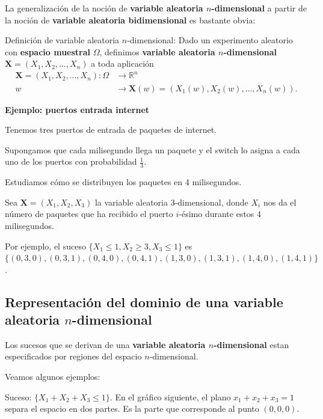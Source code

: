 \documentclass[]{book}
\begin{document}
La generalización de la noción de \textbf{variable aleatoria \(n\)-dimensional} a partir de la noción de \textbf{variable aleatoria bidimensional} es bastante obvia:

Definición de variable aleatoria \(n\)-dimensional:
Dado un experimento aleatorio con \textbf{espacio muestral} \(\Omega\), definimos \textbf{variable aleatoria \(n\)-dimensional} \(\mathbf{X}=(X_1,X_2,\ldots,X_n)\) a toda aplicación
\[
\begin{array}{rl}
\mathbf{X}=(X_1,X_2,\ldots,X_n): \Omega & \longrightarrow \mathbb{R}^n\\
w & \longrightarrow \mathbf{X}(w)=(X_1(w),X_2(w),\ldots,X_n(w)).
\end{array}
\]

\textbf{Ejemplo: puertos entrada internet}

Tenemos tres puertos de entrada de paquetes de internet.

Supongamos que cada milisegundo llega un paquete y el switch lo asigna a cada uno de los puertos con probabilidad \(\frac{1}{3}\).

Estudiamos cómo se distribuyen los paquetes en 4 milisegundos.

Sea \(\mathbf{X}=(X_1,X_2,X_3)\) la variable aleatoria 3-dimensional, donde \(X_i\) nos da el número de paquetes que ha recibido el puerto \(i\)-ésimo durante estos 4 milisegundos.

Por ejemplo, el suceso \(\{X_1\leq 1, X_2\geq 3, X_3\leq 1\}\) es \(\{(0,3,0),(0,3,1),(0,4,0),(0,4,1),(1,3,0),(1,3,1),(1,4,0),(1,4,1)\}\).

\hypertarget{representaciuxf3n-del-dominio-de-una-variable-aleatoria-n-dimensional}{%
\subsection{\texorpdfstring{Representación del dominio de una variable aleatoria \(n\)-dimensional}{Representación del dominio de una variable aleatoria n-dimensional}}\label{representaciuxf3n-del-dominio-de-una-variable-aleatoria-n-dimensional}}

Los sucesos que se derivan de una \textbf{variable aleatoria \(n\)-dimensional} estan especificados por regiones del espacio \(n\)-dimensional.

Veamos algunos ejemplos:

Suceso: \(\{X_1+X_2+X_3\leq 1\}\). En el gráfico siguiente, el plano \(x_1+x_2+x_3=1\) separa el espacio en dos partes. Es la parte que corresponde al punto \((0,0,0)\).
\end{document}
